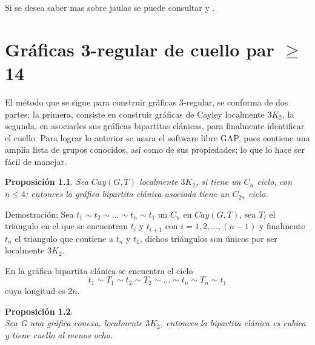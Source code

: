 \documentclass[11pt]{book}
\newtheorem{proposition}{Proposición}
\theoremstyle{definition}
\begin{document}
Si se desea saber mas sobre jaulas se puede consultar
\cite{cuellogrande} y \cite{survey}.

\chapter{Gráficas 3-regular de cuello par $\geq$ 14}

El método que se sigue para construir gráficas 3-regular, se conforma
de dos partes; la primera, consiste en construir gráficas de Cayley
localmente $3K_2$, la segunda, en asociarles sus gráficas bipartitas
clánicas, para finalmente identificar el cuello. Para lograr lo
anterior se usara el software libre GAP, pues contiene una amplia
lista de grupos conocidos, así como de sus propiedades; lo que lo hace
ser fácil de manejar.

\begin{proposition}\label{2nciclo}
  Sea $Cay(G,T)$ localmente $3K_2$, si tiene un $C_n$ ciclo, con $n\le
  4$; entonces la gráfica bipartita clánica asociada tiene un $C_{2n}$
  ciclo.
\end{proposition}

Demostración: Sea $t_1\sim t_2\sim ... \sim t_n \sim t_1$ un $C_n$ en
$Cay(G,T)$, sea $T_i$ el triangulo en el que se encuentran $t_i$ y
$t_{i+1}$ con $i=1,2,...,(n-1)$ y finalmente $t_n$ el triangulo que
contiene a $t_n$ y $t_1$, dichos triángulos son únicos por ser
localmente $3K_2$.

En la gráfica bipartita clánica se encuentra el ciclo
$$t_1\sim T_1\sim t_2 \sim T_2 \sim ... \sim t_n \sim T_n \sim t_1$$
cuya longitud es $2n$.


\begin{proposition}\textbf{}\\
  Sea G una gráfica conexa, localmente $3K_2$, entonces la bipartita
  clánica es cubica y tiene cuello al menos ocho.\label{cuello8omas}
\end{proposition}
\end{document}

